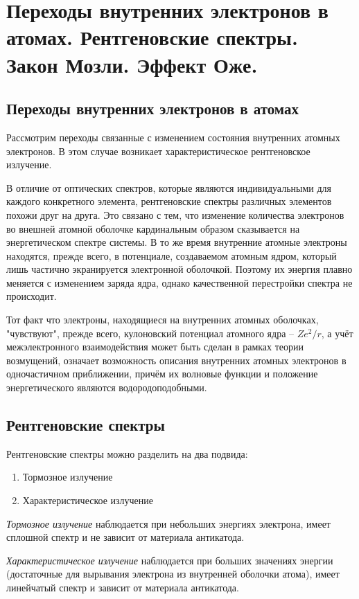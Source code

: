 \chapter{Переходы внутренних электронов в атомах. Рентгеновские спектры. 
Закон Мозли. Эффект Оже.}

\section{Переходы внутренних электронов в атомах}
Рассмотрим переходы связанные с изменением состояния внутренних атомных 
электронов. В этом случае возникает характеристическое рентгеновское излучение. 

В отличие от оптических спектров, которые являются индивидуальными для 
каждого конкретного элемента, рентгеновские спектры различных элементов похожи 
друг на друга. Это связано с тем, что изменение количества электронов во внешней 
атомной оболочке кардинальным образом сказывается на энергетическом спектре системы. В 
то же время внутренние атомные электроны находятся, прежде всего, в потенциале, 
создаваемом атомным ядром, который лишь частично экранируется электронной оболочкой. 
Поэтому их энергия плавно меняется с изменением заряда ядра, однако качественной 
перестройки спектра не происходит.

Тот факт что электроны, находящиеся на внутренних атомных оболочках, "чувствуют", 
прежде всего, кулоновский потенциал атомного ядра -- \( Ze^2 / r \), а учёт 
межэлектронного взаимодействия может быть сделан в рамках теории возмущений, 
означает возможность описания внутренних атомных электронов в одночастичном 
приближении, причём их волновые функции и положение энергетического являются 
водородоподобными.

\section{Рентгеновские спектры}
Рентгеновские спектры можно разделить на два подвида:
\begin{enumerate}
	\item Тормозное излучение
	\item Характеристическое излучение
\end{enumerate}

\emph{Тормозное излучение} наблюдается при небольших энергиях электрона, 
имеет сплошной спектр и не зависит от материала антикатода.

\emph{Характеристическое излучение} наблюдается при больших значениях энергии 
(достаточные для вырывания электрона из внутренней оболочки атома), 
имеет линейчатый спектр и зависит от материала антикатода. 


